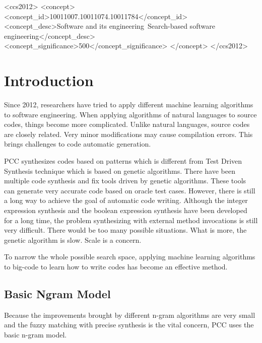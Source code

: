 \documentclass{sig-alternate-05-2015}
\begin{document}
\begin{CCSXML}
<ccs2012>
<concept>
<concept_id>10011007.10011074.10011784</concept_id>
<concept_desc>Software and its engineering~Search-based software engineering</concept_desc>
<concept_significance>500</concept_significance>
</concept>
</ccs2012>
\end{CCSXML}
\printccsdesc

\vspace{-0.1cm}

\section{Introduction}

Since 2012, researchers have tried to apply different machine learning algorithms to software engineering. When applying algorithms of natural languages to source codes, things become more complicated. Unlike natural languages, source codes are closely related. Very minor modifications may cause compilation errors. This brings challenges to code automatic generation.

PCC synthesizes codes based on patterns which is different from Test Driven Synthesis technique which is based on genetic algorithms. There have been multiple code synthesis and fix tools\cite{DBLP:conf/icse/WeimerNGF09}\cite{nguyen2013semfix}\cite{perelman2014test} driven by genetic algorithms. These tools can generate very accurate code based on oracle test cases. However, there is still a long way to achieve the goal of automatic code writing. Although the integer expression synthesis and the boolean expression synthesis have been developed for a long time, the problem synthesizing with external method invocations is still very difficult. There would be too many possible situations. What is more, the genetic algorithm is slow. Scale is a concern.

To narrow the whole possible search space, applying machine learning algorithms to big-code to learn how to write codes has become an effective method.

\subsection{Basic Ngram Model}

Because the improvements brought by different n-gram algorithms are very small and the fuzzy matching with precise synthesis is the vital concern, PCC uses the basic n-gram model.
\end{document}
